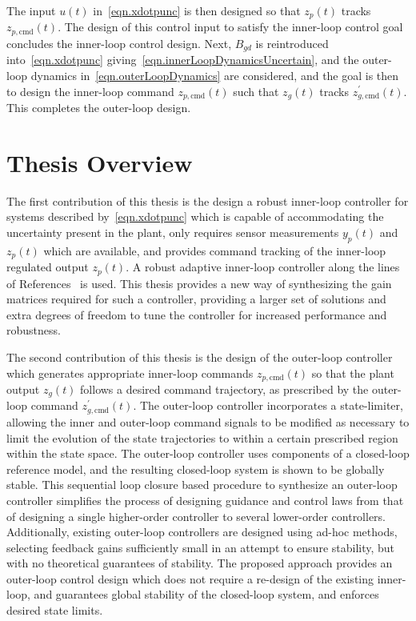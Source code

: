 The input $u(t)$ in\ \eqref{eqn.xdotpunc} is then designed so that $z_{p}(t)$ tracks $z_{p,\text{cmd}}(t)$.
The design of this control input to satisfy the inner-loop control goal concludes the inner-loop control design.
Next, $B_{gd}$ is reintroduced into\ \eqref{eqn.xdotpunc} giving\ \eqref{eqn.innerLoopDynamicsUncertain}, and the outer-loop dynamics in\ \eqref{eqn.outerLoopDynamics} are considered, and the goal is then to design the inner-loop command $z_{p,\text{cmd}}(t)$ such that $z_{g}(t)$ tracks $z_{g,\text{cmd}}^{\prime}(t)$.
This completes the outer-loop design.

\section{Thesis Overview}

The first contribution of this thesis is the design a robust inner-loop controller for systems described by\ \eqref{eqn.xdotpunc} which is capable of accommodating the uncertainty present in the plant, only requires sensor measurements $y_{p}(t)$ and $z_{p}(t)$ which are available, and provides command tracking of the inner-loop regulated output $z_{p}(t)$.
A robust adaptive inner-loop controller along the lines of References\ \cite{lavretskywise.book.2013, qu.jgcd.2016, wiese.adaptive.2013, wise.munition.2005, wise.autopilot.2008} is used.
This thesis provides a new way of synthesizing the gain matrices required for such a controller, providing a larger set of solutions and extra degrees of freedom to tune the controller for increased performance and robustness.

The second contribution of this thesis is the design of the outer-loop controller which generates appropriate inner-loop commands $z_{p,\text{cmd}}(t)$ so that the plant output $z_{g}(t)$ follows a desired command trajectory, as prescribed by the outer-loop command $z_{g,\text{cmd}}^{\prime}(t)$.
The outer-loop controller incorporates a state-limiter, allowing the inner and outer-loop command signals to be modified as necessary to limit the evolution of the state trajectories to within a certain prescribed region within the state space.
The outer-loop controller uses components of a closed-loop reference model, and the resulting closed-loop system is shown to be globally stable.
This sequential loop closure based procedure to synthesize an outer-loop controller simplifies the process of designing guidance and control laws from that of designing a single higher-order controller to several lower-order controllers.
Additionally, existing outer-loop controllers are designed using ad-hoc methods, selecting feedback gains sufficiently small in an attempt to ensure stability, but with no theoretical guarantees of stability.
The proposed approach provides an outer-loop control design which does not require a re-design of the existing inner-loop, and guarantees global stability of the closed-loop system, and enforces desired state limits.

